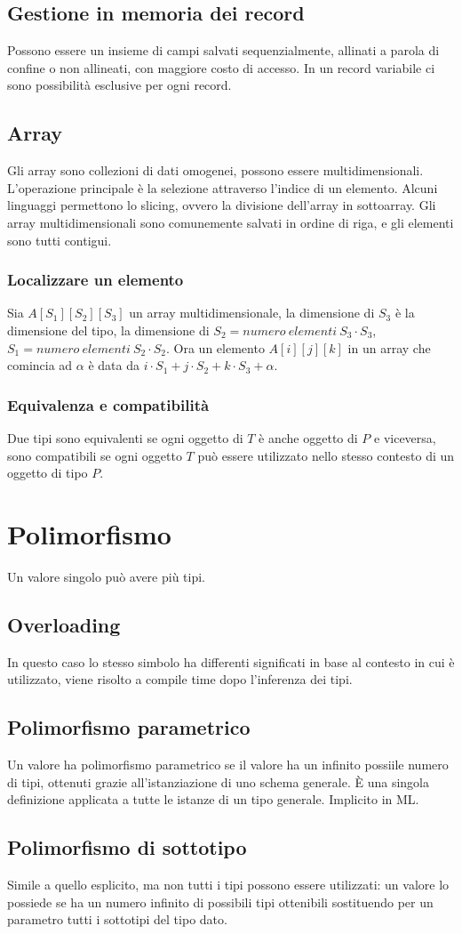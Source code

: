 \subsection{Gestione in memoria dei record}
Possono essere un insieme di campi salvati sequenzialmente, allinati a parola di confine o non allineati, con maggiore costo di accesso. In un record variabile ci sono 
possibilit\`a esclusive per ogni record. 
\subsection{Array}
Gli array sono collezioni di dati omogenei, possono essere multidimensionali. L'operazione principale \`e la selezione attraverso l'indice di un elemento. Alcuni linguaggi 
permettono lo slicing, ovvero la divisione dell'array in sottoarray. Gli array multidimensionali sono comunemente salvati in ordine di riga, e gli elementi sono tutti contigui.
\subsubsection{Localizzare un elemento}
Sia $A[S_1][S_2][S_3]$ un array multidimensionale, la dimensione di $S_3$ \`e la dimensione del tipo, la dimensione di $S_2=numero\ elementi\ S_3\cdot S_3$, $S_1=numero\ elementi\ S_2\cdot S_2$. Ora un elemento $A[i][j][k]$ in un array che comincia ad $\alpha$ \`e data da $i\cdot S_1+j\cdot S_2+k\cdot S_3+\alpha$.
\subsubsection{Equivalenza e compatibilit\`a}
Due tipi sono equivalenti se ogni oggetto di $T$ \`e anche oggetto di $P$ e viceversa, sono compatibili se ogni oggetto $T$ pu\`o essere utilizzato nello stesso contesto di 
un oggetto di tipo $P$. 
\section{Polimorfismo}
Un valore singolo pu\`o avere pi\`u tipi.
\subsection{Overloading}
In questo caso lo stesso simbolo ha differenti significati in base al contesto in cui \`e utilizzato, viene risolto a compile time dopo l'inferenza dei tipi.
\subsection{Polimorfismo parametrico}
Un valore ha polimorfismo parametrico se il valore ha un infinito possiile numero di tipi, ottenuti grazie all'istanziazione di uno schema generale. \`E una singola definizione
applicata a tutte le istanze di un tipo generale. Implicito in ML.
\subsection{Polimorfismo di sottotipo}
Simile a quello esplicito, ma non tutti i tipi possono essere utilizzati: un valore lo possiede se ha un numero infinito di possibili tipi ottenibili sostituendo per un 
parametro tutti i sottotipi del tipo dato. 